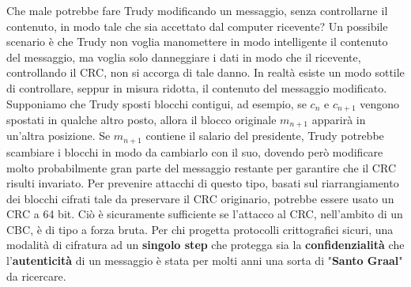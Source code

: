 \newline \newline 
Che male potrebbe fare Trudy modificando un messaggio, senza controllarne il contenuto, in modo
tale che sia accettato dal computer ricevente? Un possibile scenario è che Trudy non voglia manomettere in modo intelligente il contenuto del messaggio, ma voglia solo danneggiare i dati in modo che il ricevente, controllando il CRC, non si accorga di tale danno. 
\newline \newline
In realtà esiste un modo sottile di controllare, seppur in misura ridotta, il contenuto del messaggio modificato. Supponiamo che Trudy sposti blocchi contigui, ad esempio, se $c_{n}$ e $c_{n+1}$ vengono spostati in qualche altro posto, allora il blocco originale $m_{n+1}$ apparirà in un'altra posizione. Se $m_{n+1}$ contiene il salario del presidente, Trudy potrebbe scambiare i blocchi in modo da cambiarlo con il suo, dovendo però modificare molto probabilmente gran parte del messaggio restante per garantire che il CRC risulti invariato.\newline \newline
Per prevenire attacchi di questo tipo, basati sul riarrangiamento dei blocchi cifrati tale da preservare il CRC originario, potrebbe essere usato un CRC a 64 bit. Ciò è sicuramente sufficiente se l'attacco al CRC, nell'ambito di un CBC, è di tipo a forza bruta. 
\newline \newline
Per chi progetta protocolli crittografici sicuri, una modalità di cifratura ad un \textbf{singolo step} che protegga sia la \textbf{confidenzialità} che l'\textbf{autenticità} di un messaggio è stata per molti anni una sorta di "\textbf{Santo Graal}" da ricercare.
